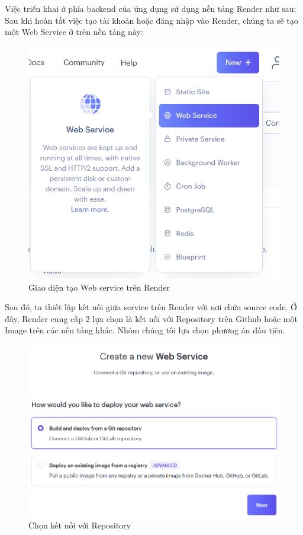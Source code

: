 Việc triển khai ở phía backend của ứng dụng sử dụng nền tảng Render như sau:
\newline
Sau khi hoàn tất việc tạo tài khoản hoặc đăng nhập vào Render, chúng ta sẽ tạo một Web Service ở trên nền tảng này:
\begin{figure}[H]
    \centering
    \includegraphics[width=0.7\linewidth]{Content/Hiện thực hệ thống/images/Webservice.png}
    \vspace{0.5cm}
    \caption{Giao diện tạo Web service trên Render}
    \label{fig:Tạo Web service}
\end{figure}
Sau đó, ta thiết lập kết nối giữa service trên Render với nơi chứa source code. Ở đây, Render cung cấp 2 lựa chọn là kết nối với Repository trên Github hoặc một Image trên các nền tảng khác. Nhóm chúng tôi lựa chọn phương án đầu tiên.
\begin{figure}[H]
    \centering
    \includegraphics[width=0.7\linewidth]{Content/Hiện thực hệ thống/images/gitrepo.png}
    \vspace{0.5cm}
    \caption{Chọn kết nối với Repository}
    \label{fig:Chọn kết nối với Repository}
\end{figure}

